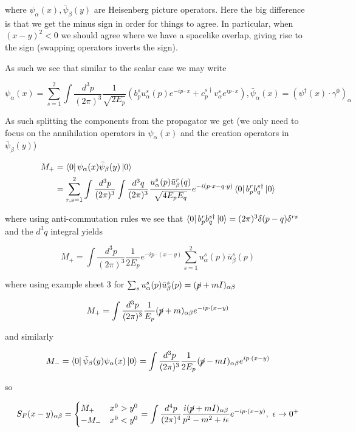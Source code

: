 \documentclass{article}
\theoremstyle{definition}
\begin{document}
where $\psi_\alpha(x), \bar{\psi}_\beta(y)$ are Heisenberg picture operators.
Here the big difference is that we get the minus sign in order for things to
agree. In particular, when $(x - y)^2 < 0$ we should agree where we have a
spacelike overlap, giving rise to the sign (swapping operators inverts the
sign). 

As such we see that similar to the scalar case we may write

$$ \psi_\alpha(x) = \sum_{s = 1}^2 \int \frac{d^3p}{(2\pi)^3} \frac{1}{\sqrt{2
    E_p}} (b^s_p u^s_\alpha(p) e^{-ip \cdot x} + c^{s \dagger}_p v^s_\alpha
e^{ip \cdot x}), \bar{\psi}_\alpha(x) = (\psi^\dagger(x) \cdot
\gamma^0)_\alpha $$

As such splitting the components from the propagator we get (we only need to
focus on the annihilation operators in $\psi_\alpha(x)$ and the creation
operators in $\bar{\psi}_\beta(y)$)

\begin{align*}
M_+ &= \bra{0} \psi_\alpha(x) \bar{\psi}_\beta(y) \ket{0} \\
&= \sum_{r,s = 1}^2 \int \frac{d^3p}{(2\pi)^3} \int \frac{d^3q}{(2\pi)^3}
   \frac{u_\alpha^s(p) \bar{u}_\beta^r(q)}{\sqrt{4 E_p E_q}} e^{-i(p \cdot x - q \cdot y)} 
   \bra{0} b_p^r b_q^{s \dagger} \ket{0}
\end{align*}

where using anti-commutation rules we see that $\bra{0} b_p^r b_q^{s \dagger}
\ket{0} = (2\pi)^3 \delta(p - q) \delta^{rs}$ and the $d^3q$ integral yields

$$ M_+ = \int \frac{d^3p}{(2\pi)^3} \frac{1}{2E_p} e^{-ip \cdot (x - y)} \sum_{s
= 1}^2 u^s_\alpha(p) \bar{u}^s_\beta (p) $$

where using example sheet 3 for $\sum_s u^s_\alpha(p) \bar{u}_\beta^s(p) =
(\cancel{p} + mI)_{\alpha \beta}$ 

$$ M_+ = \int \frac{d^3p}{(2\pi)^3} \frac{1}{E_p} (\cancel{p} + m)_{\alpha
  \beta} e^{-ip \cdot (x - y)} $$

and similarly

$$ M_- = \bra{0} \bar{\psi}_\beta (y) \psi_\alpha (x) \ket{0} = \int
\frac{d^3p}{(2\pi)^3} \frac{1}{2E_p} (\cancel{p} - mI)_{\alpha \beta} e^{ip
  \cdot (x - y)} $$

so

$$ S_F(x - y)_{\alpha \beta} = 
\begin{cases}
M_+ & x^0 > y^0 \\
-M_- & x^0 < y^0
\end{cases} 
= \int \frac{d^4p}{(2\pi)^4} \frac{i(\cancel{p} + mI)_{\alpha \beta}}{p^2 - m^2
  + i \epsilon} e^{-ip \cdot (x - y)}, \ \epsilon \to 0^+ $$
\end{document}
